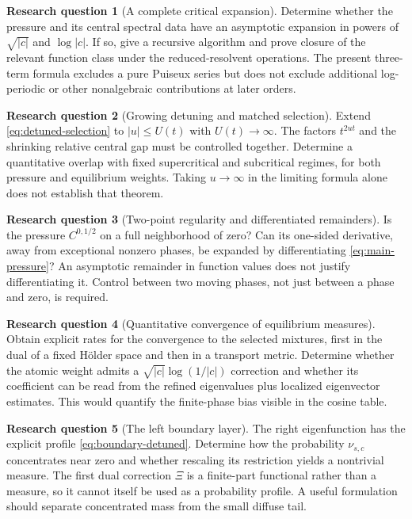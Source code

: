 \documentclass[11pt,a4paper]{article}
\numberwithin{equation}{section}
\theoremstyle{definition}
\newtheorem{question}{Research question}
\theoremstyle{remark}
\begin{document}
\begin{question}[A complete critical expansion]
Determine whether the pressure and its central spectral data have an
asymptotic expansion in powers of $\sqrt{|c|}$ and $\log|c|$. If so,
give a recursive algorithm and prove closure of the relevant function
class under the reduced-resolvent operations. The present three-term
formula excludes a pure Puiseux series but does not exclude additional
log-periodic or other nonalgebraic contributions at later orders.
\end{question}

\begin{question}[Growing detuning and matched selection]
Extend \cref{eq:detuned-selection} to $|u|\le U(t)$ with $U(t)\to\infty$.
The factors $t^{2ut}$ and the shrinking relative central gap must be
controlled together. Determine a quantitative overlap with fixed
supercritical and subcritical regimes, for both pressure and equilibrium
weights. Taking $u\to\infty$ in the limiting formula alone does not
establish that theorem.
\end{question}

\begin{question}[Two-point regularity and differentiated remainders]
Is the pressure $C^{0,1/2}$ on a full neighborhood of zero? Can its
one-sided derivative, away from exceptional nonzero phases, be expanded
by differentiating \cref{eq:main-pressure}? An asymptotic remainder in
function values does not justify differentiating it. Control between
two moving phases, not just between a phase and zero, is required.
\end{question}

\begin{question}[Quantitative convergence of equilibrium measures]
Obtain explicit rates for the convergence to the selected mixtures,
first in the dual of a fixed H\"older space and then in a transport
metric. Determine whether the atomic weight admits a
$\sqrt{|c|}\log(1/|c|)$ correction and whether its coefficient can be
read from the refined eigenvalues plus localized eigenvector estimates.
This would quantify the finite-phase bias visible in the cosine table.
\end{question}

\begin{question}[The left boundary layer]
The right eigenfunction has the explicit profile
\cref{eq:boundary-detuned}. Determine how the probability $\nu_{s,c}$
concentrates near zero and whether rescaling its restriction yields a
nontrivial measure. The first dual correction $\Xi$ is a finite-part
functional rather than a measure, so it cannot itself be used as a
probability profile. A useful formulation should separate concentrated
mass from the small diffuse tail.
\end{question}
\end{document}
